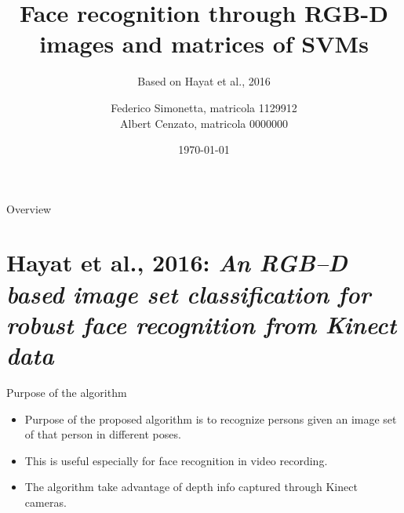 \documentclass{beamer}
\title{Face recognition through RGB-D images and matrices of SVMs} %
\subtitle{Based on Hayat et al., 2016}
\date{\today}
\author{Federico Simonetta, matricola 1129912 \\[1ex] Albert Cenzato, matricola 0000000 }
\begin{document}
\maketitle
{}

\begin{frame}{Overview}
	\vspace*{3mm}
\end{frame}

\section{Hayat et al., 2016: \textit{An RGB–D based image set classification
for robust face recognition from Kinect data}}
\begin{frame}{Purpose of the algorithm}
	\begin{itemize}
		\item Purpose of the proposed algorithm is to recognize persons
			given an image set of that person in different poses.
		\item This is useful especially for face recognition in video
			recording.
		\item The algorithm take advantage of depth info captured
			through Kinect cameras.
	\end{itemize}
	\vspace*{-8mm}

\end{frame}
\end{document}
